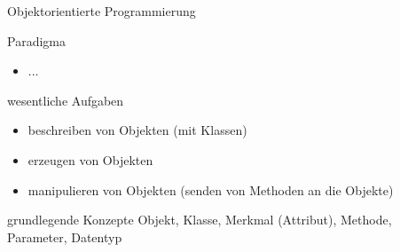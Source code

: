 \begin{frame}{Objektorientierte Programmierung}
    \begin{block}{Paradigma}
        \begin{itemize}
        \item ...
        \end{itemize}
    \end{block}

    \begin{block}{wesentliche Aufgaben}
        \begin{itemize}
        \item \color{wings}beschreiben \color{black}von Objekten (mit Klassen)
        \item \color{wings}erzeugen \color{black}von Objekten
        \item \color{wings}manipulieren \color{black}von Objekten (\color{wings}senden \color{black}von Methoden an die Objekte)
        \end{itemize}
    \end{block}

    \begin{block}{grundlegende Konzepte}
        Objekt, Klasse, Merkmal (Attribut), Methode, Parameter, Datentyp 
    \end{block}
\end{frame}

\begin{frame}{}
\end{frame}

\begin{frame}{}
\end{frame}
